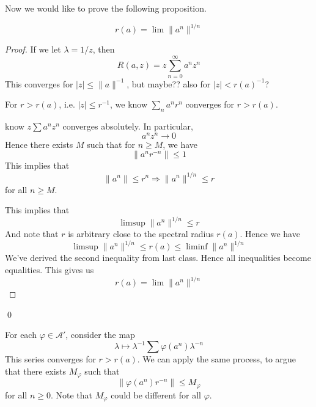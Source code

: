 Now we would like to prove the following proposition.
\begin{proposition}
    \begin{equation*}
        r(a)=\lim\|a^n\|^{1/n}
    \end{equation*}
\end{proposition}
\begin{proof}

If we let $\lambda=1/z$, then 
\begin{equation*}
    R(a,z)=z\sum_{n=0}^\infty a^nz^n
\end{equation*}
This converges for $|z|\leq\|a\|^{-1}$, but maybe?? also for $|z|< r(a)^{-1}$?

For $r>r(a)$, i.e. $|z|\leq r^{-1}$, we  know $\sum_na^nr^n$ converges for $r>r(a)$. 

know $z\sum a^nz^n$ converges absolutely. In particular,
\begin{equation*}
    a^nz^n\to 0
\end{equation*}
Hence there exists $M$ such that for $n\geq M$, we have
\begin{equation*}
    \|a^nr^{-n}\|\leq 1
\end{equation*}
This implies that
\begin{equation*}
    \|a^n\|\leq r^n \Rightarrow \|a^n\|^{1/n}\leq r 
\end{equation*}
for all $n\geq M$.

This implies that
\begin{equation*}
    \limsup \|a^n\|^{1/n}\leq r
\end{equation*}
And note that $r$ is arbitrary close to the spectral radius $r(a)$. Hence we have
\begin{equation*}
    \limsup \|a^n\|^{1/n}\leq r(a)\leq\liminf\|a^n\|^{1/n}
\end{equation*}
We've derived the second inequality from last class. Hence all inequalities become equalities.
This gives us
\begin{equation*}
    r(a)=\lim \|a^n\|^{1/n}
\end{equation*}

\end{proof}
\qed


For each $\varphi\in\mathcal{A}'$, consider the map
\begin{equation*}
    \lambda\mapsto\lambda^{-1}\sum\varphi(a^n)\lambda^{-n}
\end{equation*}
This series converges for $r>r(a)$.
We can apply the same process, to argue that there exists $M_\varphi$ such that
\begin{equation*}
    \|\varphi(a^n)r^{-n}\|\leq M_\varphi
\end{equation*}
for all $n\geq 0$. Note that $M_\varphi$ could be different for all $\varphi$. 


